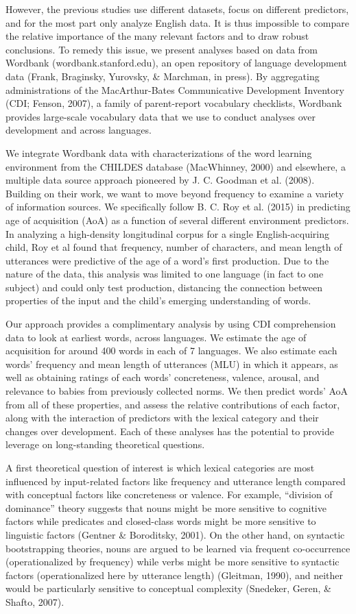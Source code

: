 \documentclass[10pt, letterpaper]{article}
\begin{document}
However, the previous studies use different datasets, focus on different
predictors, and for the most part only analyze English data. It is thus
impossible to compare the relative importance of the many relevant
factors and to draw robust conclusions. To remedy this issue, we present
analyses based on data from Wordbank (wordbank.stanford.edu), an open
repository of language development data (Frank, Braginsky, Yurovsky, \&
Marchman, in press). By aggregating administrations of the
MacArthur-Bates Communicative Development Inventory (CDI; Fenson, 2007),
a family of parent-report vocabulary checklists, Wordbank provides
large-scale vocabulary data that we use to conduct analyses over
development and across languages.

We integrate Wordbank data with characterizations of the word learning
environment from the CHILDES database (MacWhinney, 2000) and elsewhere,
a multiple data source approach pioneered by J. C. Goodman et al.
(2008). Building on their work, we want to move beyond frequency to
examine a variety of information sources. We specifically follow B. C.
Roy et al. (2015) in predicting age of acquisition (AoA) as a function
of several different environment predictors. In analyzing a high-density
longitudinal corpus for a single English-acquiring child, Roy et al
found that frequency, number of characters, and mean length of
utterances were predictive of the age of a word's first production. Due
to the nature of the data, this analysis was limited to one language (in
fact to one subject) and could only test production, distancing the
connection between properties of the input and the child's emerging
understanding of words.

Our approach provides a complimentary analysis by using CDI
comprehension data to look at earliest words, across languages. We
estimate the age of acquisition for around 400 words in each of 7
languages. We also estimate each words' frequency and mean length of
utterances (MLU) in which it appears, as well as obtaining ratings of
each words' concreteness, valence, arousal, and relevance to babies from
previously collected norms. We then predict words' AoA from all of these
properties, and assess the relative contributions of each factor, along
with the interaction of predictors with the lexical category and their
changes over development. Each of these analyses has the potential to
provide leverage on long-standing theoretical questions.

A first theoretical question of interest is which lexical categories are
most influenced by input-related factors like frequency and utterance
length compared with conceptual factors like concreteness or valence.
For example, ``division of dominance'' theory suggests that nouns might
be more sensitive to cognitive factors while predicates and closed-class
words might be more sensitive to linguistic factors (Gentner \&
Boroditsky, 2001). On the other hand, on syntactic bootstrapping
theories, nouns are argued to be learned via frequent co-occurrence
(operationalized by frequency) while verbs might be more sensitive to
syntactic factors (operationalized here by utterance length) (Gleitman,
1990), and neither would be particularly sensitive to conceptual
complexity (Snedeker, Geren, \& Shafto, 2007).
\end{document}
